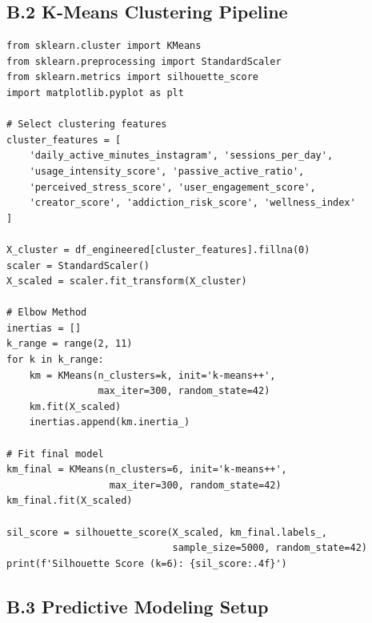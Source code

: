 \documentclass[12pt,a4paper]{article}
\begin{document}
\subsection*{B.2 K-Means Clustering Pipeline}
 
\begin{verbatim}
from sklearn.cluster import KMeans
from sklearn.preprocessing import StandardScaler
from sklearn.metrics import silhouette_score
import matplotlib.pyplot as plt
 
# Select clustering features
cluster_features = [
    'daily_active_minutes_instagram', 'sessions_per_day',
    'usage_intensity_score', 'passive_active_ratio',
    'perceived_stress_score', 'user_engagement_score',
    'creator_score', 'addiction_risk_score', 'wellness_index'
]
 
X_cluster = df_engineered[cluster_features].fillna(0)
scaler = StandardScaler()
X_scaled = scaler.fit_transform(X_cluster)
 
# Elbow Method
inertias = []
k_range = range(2, 11)
for k in k_range:
    km = KMeans(n_clusters=k, init='k-means++',
                max_iter=300, random_state=42)
    km.fit(X_scaled)
    inertias.append(km.inertia_)
 
# Fit final model
km_final = KMeans(n_clusters=6, init='k-means++',
                  max_iter=300, random_state=42)
km_final.fit(X_scaled)
 
sil_score = silhouette_score(X_scaled, km_final.labels_,
                             sample_size=5000, random_state=42)
print(f'Silhouette Score (k=6): {sil_score:.4f}')
\end{verbatim}
 
\subsection*{B.3 Predictive Modeling Setup}
 
\end{document}
